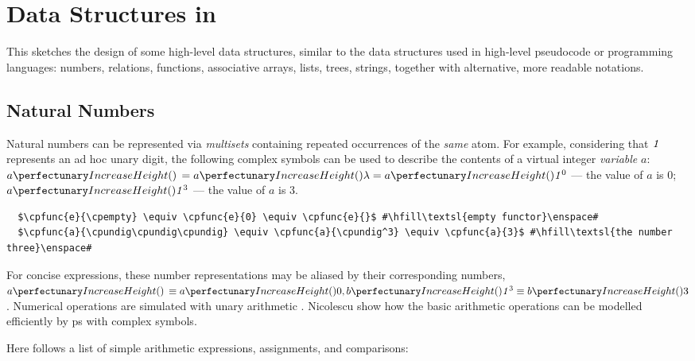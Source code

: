 \section{Data Structures in }\label{sec:cps:datastructures}

This  sketches the design of some high-level data structures, 
similar to the data structures used in high-level pseudocode or programming languages:
numbers, relations, functions, associative arrays, lists, trees, strings, 
together with alternative, more readable notations.

\subsection{\label{sec:cps:natnums}Natural Numbers}
Natural numbers can be represented via \emph{multisets} containing repeated occurrences of the \emph{same} atom.
For example, considering that \(\mathit{1}\) represents an ad hoc unary digit, 
the following complex symbols can be used to describe 
the contents of a virtual integer \emph{variable} \(a\): 
\(\cpfunc{a}{\,} = \cpfunc{a}{\cpempty} = \cpfunc{a}{\cpundig^0}\) --- the value of \(a\) is 0;
\(\cpfunc{a}{\cpundig^3}\) --- the value of \(a\) is 3.

\lstset{xleftmargin=.5in, xrightmargin=.5in} 
\begin{lstlisting}
  $\cpfunc{e}{\cpempty} \equiv \cpfunc{e}{0} \equiv \cpfunc{e}{}$ #\hfill\textsl{empty functor}\enspace#
  $\cpfunc{a}{\cpundig\cpundig\cpundig} \equiv \cpfunc{a}{\cpundig^3} \equiv \cpfunc{a}{3}$ #\hfill\textsl{the number three}\enspace#
\end{lstlisting}

For concise expressions, these number representations may be aliased by their corresponding numbers, \eg{}~\(\cpfunc{a}{\,} \equiv \cpfunc{a}{0}, \cpfunc{b}{\cpundig^3} \equiv \cpfunc{b}{3}\).  Numerical operations are simulated with unary arithmetic \cite{Aman2019,Bonchis2006}.
Nicolescu \etal{} \cite{Nicolescu2014,RN-HW-ROMJIST14} show how the basic arithmetic operations can be modelled efficiently by \gls{ps} with complex symbols.

Here follows a list of simple arithmetic expressions, assignments, and comparisons:

